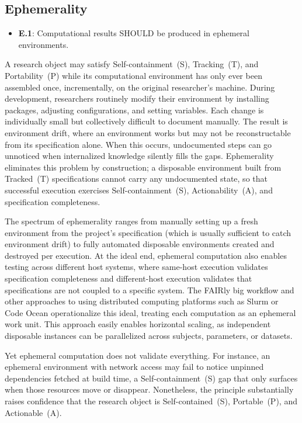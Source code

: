 \documentclass{article}
\makeatletter
\newcommand{\hyanchor}[1]{\texorpdfstring{\Hy@raisedlink{\hypertarget{#1}{}}}{}}
\newcommand{\anchoredsubsection}[2]{\subsection[#2]{\hyanchor{#1}#2}}
\makeatother
\begin{document}
\anchoredsubsection{ephemerality}{Ephemerality}

\begin{itemize}
    \item \textbf{E.1}: Computational results SHOULD be produced in ephemeral environments.
\end{itemize}

A research object may satisfy Self-containment~(S), Tracking~(T), and Portability~(P) while its computational environment has only ever been assembled once, incrementally, on the original researcher's machine.
During development, researchers routinely modify their environment by installing packages, adjusting configurations, and setting variables.
Each change is individually small but collectively difficult to document manually.
The result is environment drift, where an environment works but may not be reconstructable from its specification alone.
When this occurs, undocumented steps can go unnoticed when internalized knowledge silently fills the gaps.
Ephemerality eliminates this problem by construction; a disposable environment built from Tracked~(T) specifications cannot carry any undocumented state, so that successful execution exercises Self-containment~(S), Actionability~(A), and specification completeness.

The spectrum of ephemerality ranges from manually setting up a fresh environment from the project's specification (which is usually sufficient to catch environment drift) to fully automated disposable environments created and destroyed per execution.
At the ideal end, ephemeral computation also enables testing across different host systems, where same-host execution validates specification completeness and different-host execution validates that specifications are not coupled to a specific system.
The FAIRly big workflow\cite{wagner_fairly_2022} and other approaches to using distributed computing platforms such as Slurm or Code Ocean\cite{cheifet_promoting_2021} operationalize this ideal, treating each computation as an ephemeral work unit.
This approach easily enables horizontal scaling, as independent disposable instances can be parallelized across subjects, parameters, or datasets.

Yet ephemeral computation does not validate everything.
For instance, an ephemeral environment with network access may fail to notice unpinned dependencies fetched at build time, a Self-containment~(S) gap that only surfaces when those resources move or disappear.
Nonetheless, the principle substantially raises confidence that the research object is Self-contained~(S), Portable~(P), and Actionable~(A).
\end{document}
